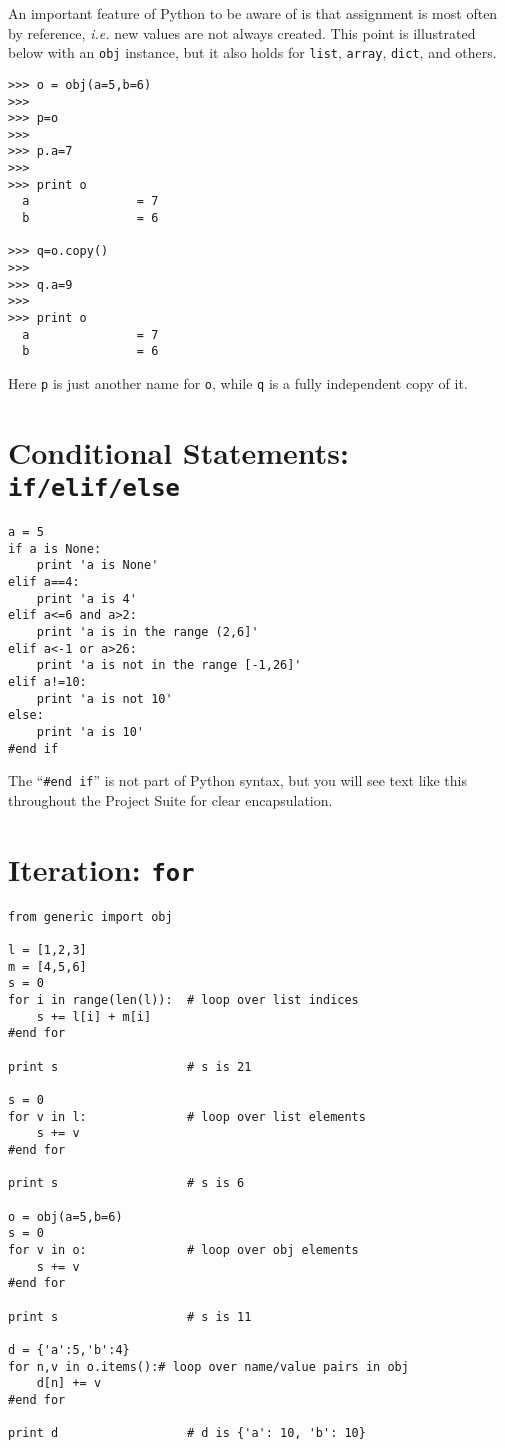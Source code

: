 \documentclass[oneside,11pt]{memoir}
\numberwithin{equation}{section}
\begin{document}
An important feature of Python to be aware of is that assignment is most often by reference, \emph{i.e.} new values are not always created.  This point is illustrated below with an \texttt{obj} instance, but it also holds for \texttt{list}, \texttt{array}, \texttt{dict}, and others.
\begin{shaded}
\begin{verbatim}
>>> o = obj(a=5,b=6)
>>> 
>>> p=o
>>> 
>>> p.a=7
>>> 
>>> print o
  a               = 7
  b               = 6

>>> q=o.copy()
>>> 
>>> q.a=9
>>> 
>>> print o
  a               = 7
  b               = 6
\end{verbatim}
\end{shaded}
\noindent
Here \texttt{p} is just another name for \texttt{o}, while \texttt{q} is a fully independent copy of it.


\section{Conditional Statements: \texttt{if/elif/else}}
\begin{shaded}
\begin{verbatim}
a = 5
if a is None:
    print 'a is None'
elif a==4:
    print 'a is 4'
elif a<=6 and a>2:
    print 'a is in the range (2,6]'
elif a<-1 or a>26:
    print 'a is not in the range [-1,26]'
elif a!=10: 
    print 'a is not 10'
else:
    print 'a is 10'
#end if

\end{verbatim}
\end{shaded}
The ``\texttt{\#end if}'' is not part of Python syntax, but you will see text like this throughout the Project Suite for clear encapsulation.

\section{Iteration: \texttt{for}}
\begin{shaded}
\begin{verbatim}
from generic import obj

l = [1,2,3]              
m = [4,5,6]
s = 0
for i in range(len(l)):  # loop over list indices
    s += l[i] + m[i]
#end for

print s                  # s is 21

s = 0                    
for v in l:              # loop over list elements
    s += v
#end for

print s                  # s is 6

o = obj(a=5,b=6)
s = 0
for v in o:              # loop over obj elements
    s += v
#end for

print s                  # s is 11

d = {'a':5,'b':4}
for n,v in o.items():# loop over name/value pairs in obj
    d[n] += v
#end for

print d                  # d is {'a': 10, 'b': 10}

\end{verbatim}
\end{shaded}
\end{document}
